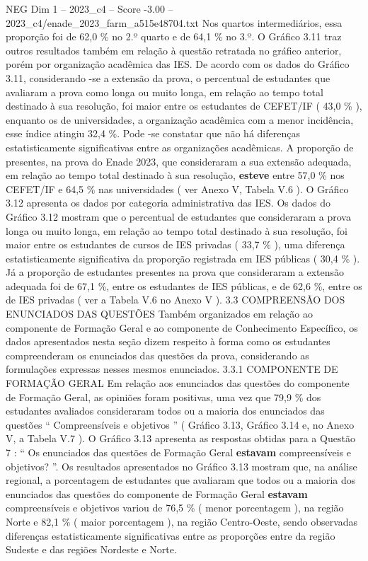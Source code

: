 \begin{textsample}{NEG Dim 1 – 2023\_c4 – Score -3.00 – 2023\_c4/enade\_2023\_farm\_a515e48704.txt}
Nos quartos intermediários, essa proporção foi de 62,0 \% no 2.º quarto e de 64,1 \% no 3.º.
O Gráfico 3.11 traz outros resultados também em relação à questão retratada no gráfico anterior, porém por organização acadêmica das IES.
De acordo com os dados do Gráfico 3.11, considerando -se a extensão da prova, o percentual de estudantes que avaliaram a prova como longa ou muito longa, em relação ao tempo total destinado à sua resolução, foi maior entre os estudantes de CEFET/IF ( 43,0 \% ), enquanto os de universidades, a organização acadêmica com a menor incidência, esse índice atingiu 32,4 \%.
Pode -se constatar que não há diferenças estatisticamente significativas entre as organizações acadêmicas.
A proporção de presentes, na prova do Enade 2023, que consideraram a sua extensão adequada, em relação ao tempo total destinado à sua resolução, \textbf{esteve} entre 57,0 \% nos CEFET/IF e 64,5 \% nas universidades ( ver Anexo V, Tabela V.6 ).
O Gráfico 3.12 apresenta os dados por categoria administrativa das IES.
Os dados do Gráfico 3.12 mostram que o percentual de estudantes que consideraram a prova longa ou muito longa, em relação ao tempo total destinado à sua resolução, foi maior entre os estudantes de cursos de IES privadas ( 33,7 \% ), uma diferença estatisticamente significativa da proporção registrada em IES públicas ( 30,4 \% ).
Já a proporção de estudantes presentes na prova que consideraram a extensão adequada foi de 67,1 \%, entre os estudantes de IES públicas, e de 62,6 \%, entre os de IES privadas ( ver a Tabela V.6 no Anexo V ). 3.3 COMPREENSÃO DOS ENUNCIADOS DAS QUESTÕES Também organizados em relação ao componente de Formação Geral e ao componente de Conhecimento Específico, os dados apresentados nesta seção dizem respeito à forma como os estudantes compreenderam os enunciados das questões da prova, considerando as formulações expressas nesses mesmos enunciados. 3.3.1 COMPONENTE DE FORMAÇÃO GERAL Em relação aos enunciados das questões do componente de Formação Geral, as opiniões foram positivas, uma vez que 79,9 \% dos estudantes avaliados consideraram todos ou a maioria dos enunciados das questões “ Compreensíveis e objetivos ” ( Gráfico 3.13, Gráfico 3.14 e, no Anexo V, a Tabela V.7 ).
O Gráfico 3.13 apresenta as respostas obtidas para a Questão 7 : “ Os enunciados das questões de Formação Geral \textbf{estavam} compreensíveis e objetivos? ”.
Os resultados apresentados no Gráfico 3.13 mostram que, na análise regional, a porcentagem de estudantes que avaliaram que todos ou a maioria dos enunciados das questões do componente de Formação Geral \textbf{estavam} compreensíveis e objetivos variou de 76,5 \% ( menor porcentagem ), na região Norte e 82,1 \% ( maior porcentagem ), na região Centro-Oeste, sendo observadas diferenças estatisticamente significativas entre as proporções entre da região Sudeste e das regiões Nordeste e Norte.

\end{textsample}
